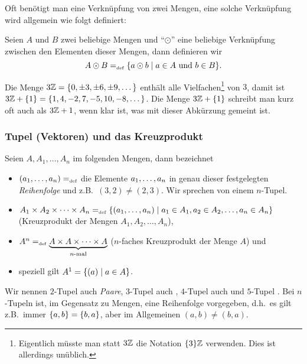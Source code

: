 \goodbreak

Oft benötigt man eine Verknüpfung von zwei Mengen, eine solche
Verknüpfung wird allgemein wie folgt definiert:

\begin{definition}
Seien $A$ und $B$ zwei beliebige Mengen und "`$\odot$"' eine beliebige
Verknüpfung zwischen den Elementen dieser Mengen, dann definieren wir
\begin{displaymath}
A \odot B =_{\mathrm{\scriptscriptstyle def}} \{a \odot b \mid a \in A \text{ und } b \in B\}.
\end{displaymath}
\end{definition}

\begin{example}
Die Menge $3\mathbb Z = \{0, \pm 3, \pm 6, \pm 9, \dots\}$ enthält alle
Vielfachen\footnote{Eigentlich müsste man statt $3\mathbb Z$ die Notation
$\{3\}\mathbb Z$ verwenden. Dies ist allerdings unüblich.} von $3$, damit
ist $3\mathbb Z + \{1\} = \{1,\allowbreak 4,\allowbreak -2,\allowbreak
7,\allowbreak -5, 10, -8, \dots\}$. Die Menge $3\mathbb Z + \{1\}$ schreibt
man kurz oft auch als $3\mathbb Z + 1$, wenn klar ist, was mit dieser
Abkürzung gemeint ist.
\end{example}

\subsubsection{Tupel (Vektoren) und das Kreuzprodukt}
Seien $A, A_1, \dots , A_n$ im folgenden Mengen, dann bezeichnet

\begin{itemize}
  \item $({a_{1}}, \allowbreak \dots , \allowbreak{a_{n}}) =_{\mathrm{\scriptscriptstyle def}}$ die Elemente ${a_{1}}, \allowbreak \dots , \allowbreak{a_{n}}$ in genau dieser
  festgelegten \emph{Reihenfolge} und z.B.~$(3,2) \not= (2,3)$. Wir
  sprechen von einem $n$-Tupel.
  \item $A_1 \times A_2 \times \dots \times
  A_n =_{\mathrm{\scriptscriptstyle def}} \{({a_{1}}, \allowbreak \dots , \allowbreak{a_{n}}) \mid a_1 \in A_1, a_2 \in A_2, \dots
  ,a_n \in A_n \}$ (Kreuzprodukt der Mengen $A_1, A_2, \dots ,
  A_n$)\index{$\times$},
  \item $A^n =_{\mathrm{\scriptscriptstyle def}} \underbrace{A \times A \times \dots \times
  A}_{n\text{-mal}}$ ($n$-faches Kreuzprodukt der Menge $A$) und
  \item speziell gilt $A^1 = \{(a) \mid a \in A\}$.
\end{itemize}
Wir nennen $2$-Tupel auch \emph{Paare}, $3$-Tupel
auch , $4$-Tupel auch  und $5$-Tupel 
. Bei $n$-Tupeln ist, im Gegensatz zu Mengen, eine 
Reihenfolge vorgegeben, d.h.~es gilt z.B.~immer $\{a,b\} = \{b,a\}$, aber 
im Allgemeinen $(a,b) \not= (b,a)$.

